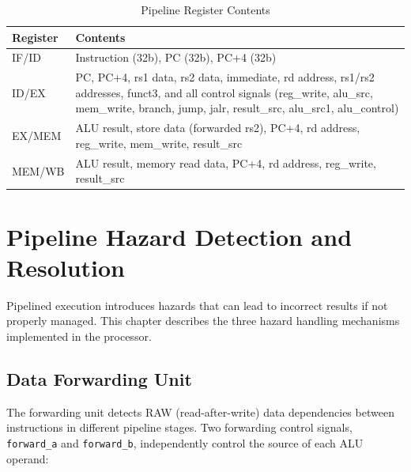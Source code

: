 \documentclass[12pt,a4paper]{report}
\begin{document}
\begin{table}[H]
\centering
\caption{Pipeline Register Contents}
\label{tab:pipereg}
\begin{tabular}{L{2.0cm} L{10.2cm}}
    \toprule
    \textbf{Register} & \textbf{Contents} \\
    \midrule
    IF/ID  & Instruction (32b), PC (32b), PC+4 (32b) \\
    ID/EX  & PC, PC+4, rs1 data, rs2 data, immediate, rd address, rs1/rs2
             addresses, funct3, and all control signals (reg\_write, alu\_src,
             mem\_write, branch, jump, jalr, result\_src, alu\_src1, alu\_control) \\
    EX/MEM & ALU result, store data (forwarded rs2), PC+4, rd address,
             reg\_write, mem\_write, result\_src \\
    MEM/WB & ALU result, memory read data, PC+4, rd address, reg\_write,
             result\_src \\
    \bottomrule
\end{tabular}
\end{table}



\chapter{Pipeline Hazard Detection and Resolution}

Pipelined execution introduces hazards that can lead to incorrect results if not
properly managed. This chapter describes the three hazard handling mechanisms
implemented in the processor.

\section{Data Forwarding Unit}
The forwarding unit detects RAW (read-after-write) data dependencies between
instructions in different pipeline stages. Two forwarding control signals,
\texttt{forward\_a} and \texttt{forward\_b}, independently control the source of
each ALU operand:
\end{document}
